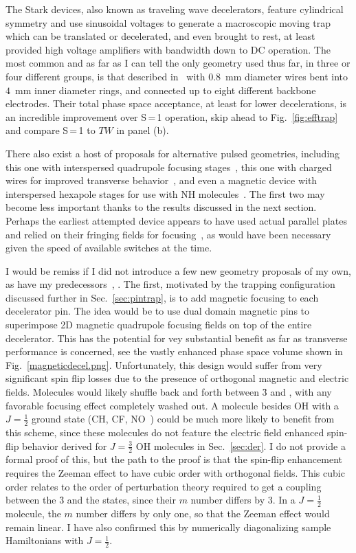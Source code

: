 The Stark devices, also known as traveling wave decelerators, feature cylindrical symmetry and use sinusoidal voltages to generate a macroscopic moving trap which can be translated or decelerated, and even brought to rest, at least provided high voltage amplifiers with bandwidth down to DC operation.
The most common and as far as I can tell the only geometry used thus far, in three or four different groups, is that described in~\cite{Osterwalder2010} with $0.8$~mm diameter wires bent into $4$~mm inner diameter rings, and connected up to eight different backbone electrodes.
Their total phase space acceptance, at least for lower decelerations, is an incredible improvement over S\,=\,1 operation, skip ahead to Fig.~\ref{fig:efftrap} and compare S\,=\,1 to $TW$ in panel (b).

There also exist a host of proposals for alternative pulsed geometries, including this one with interspersed quadrupole focusing stages~\cite{Sawyer2008a}, this one with charged wires for improved transverse behavior~\cite{Wang2016}, and even a magnetic device with interspersed hexapole stages for use with NH molecules~\cite{Plomp2019}. The first two may become less important thanks to the results discussed in the next section. Perhaps the earliest attempted device appears to have used actual parallel plates and relied on their fringing fields for focusing~\cite{Golub1967}, as would have been necessary given the speed of available switches at the time.

I would be remiss if I did not introduce a few new geometry proposals of my own, as have my predecessors~\citep[Sec.~5.5]{SawyerThesis2010}, \citep[Sec.~7.3]{HudsonThesis2006}.
The first, motivated by the trapping configuration discussed further in Sec.~\ref{sec:pintrap}, is to add magnetic focusing to each decelerator pin.
The idea would be to use dual domain magnetic pins to superimpose 2D magnetic quadrupole focusing fields on top of the entire decelerator.
This has the potential for vey substantial benefit as far as transverse performance is concerned, see the vastly enhanced phase space volume shown in Fig.~\ref{magneticdecel.png}.
Unfortunately, this design would suffer from very significant spin flip losses due to the presence of orthogonal magnetic and electric fields.
Molecules would likely shuffle back and forth between \f3 and , with any favorable focusing effect completely washed out.
A molecule besides OH with a $J=\frac{1}{2}$ ground state (CH, CF, NO~\cite{VanDeMeerakker2006thesis, weibel1998hexapole}) could be much more likely to benefit from this scheme, since these molecules do not feature the electric field enhanced spin-flip behavior derived for $J=\frac{3}{2}$ OH molecules in Sec.~\ref{sec:der}.
I do not provide a formal proof of this, but the path to the proof is that the spin-flip enhancement requires the Zeeman effect to have cubic order with orthogonal fields.
This cubic order relates to the order of perturbation theory required to get a coupling between the \f3 and the  states, since their $m$ number differs by $3$. 
In a $J=\frac{1}{2}$ molecule, the $m$ number differs by only one, so that the Zeeman effect would remain linear.
I have also confirmed this by numerically diagonalizing sample Hamiltonians with $J=\frac{1}{2}$.

